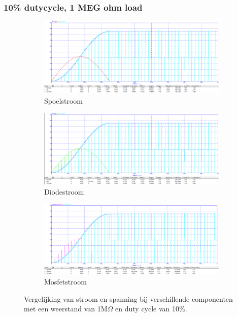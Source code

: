 \subsubsection{10\% dutycycle, 1 MEG ohm load}
\begin{figure}[ht]
    \centering
    \begin{subfigure}[b]{0.3\linewidth}
        \centering
        \includegraphics[width=\linewidth]{img/hfd1/hfd1-10pduty-1MEG-INDUCTOR.png}
        \caption{Spoelstroom}
        \label{fig:inductor}
    \end{subfigure}
    \hfill
    \begin{subfigure}[b]{0.3\linewidth}
        \centering
        \includegraphics[width=\linewidth]{img/hfd1/hfd1-10pduty-1MEG-DIODE.png}
        \caption{Diodestroom}
        \label{fig:diode}
    \end{subfigure}
    \hfill
    \begin{subfigure}[b]{0.3\linewidth}
        \centering
        \includegraphics[width=\linewidth]{img/hfd1/hfd1-10pduty-1MEG-DMOSFET.png}
        \caption{Mosfetstroom}
        \label{fig:mosfet}
    \end{subfigure}
    
    \caption{Vergelijking van stroom en spanning bij verschillende componenten met een weerstand van 1M\(\Omega\) en duty cycle van 10\%.}
    \label{fig:componenten}
\end{figure}




